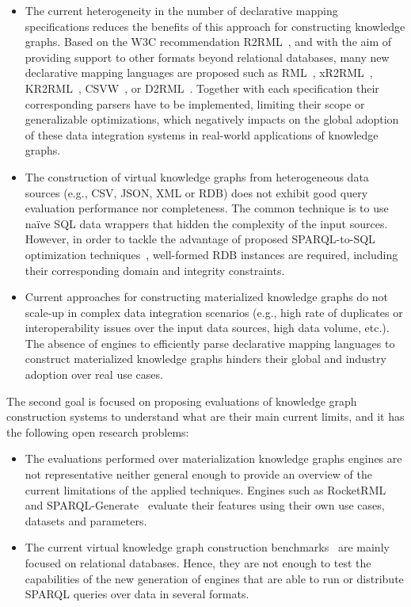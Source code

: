 \begin{itemize}
    \item The current heterogeneity in the number of declarative mapping specifications reduces the benefits of this approach for constructing knowledge graphs. Based on the W3C recommendation R2RML~\citep{R2RML}, and with the aim of providing support to other formats beyond relational databases, many new declarative mapping languages are proposed such as RML~\citep{dimou2014rml}, xR2RML~\citep{michel2015translation}, KR2RML~\citep{slepicka2015kr2rml}, CSVW~\citep{tennison2015model}, or D2RML~\citep{chortaras2018mapping}. Together with each specification their corresponding parsers have to be implemented, limiting their scope or generalizable optimizations, which negatively impacts on the global adoption of these data integration systems in real-world applications of knowledge graphs.

    \item The construction of virtual knowledge graphs from heterogeneous data sources (e.g., CSV, JSON, XML or RDB) does not exhibit good query evaluation performance nor completeness. The common technique is to use na\"ive SQL data wrappers that hidden the complexity of the input sources. However, in order to tackle the advantage of proposed SPARQL-to-SQL optimization techniques~\citep{priyatna2014formalisation,calvanese2017ontop}, well-formed RDB instances are required, including their corresponding domain and integrity constraints.

    \item Current approaches for constructing materialized knowledge graphs do not scale-up in complex data integration scenarios (e.g., high rate of duplicates or interoperability issues over the input data sources, high data volume, etc.). The absence of engines to efficiently parse declarative mapping languages to construct materialized knowledge graphs hinders their global and industry adoption over real use cases.
\end{itemize}

The second goal is focused on proposing evaluations of knowledge graph construction systems to understand what are their main current limits, and it has the following open research problems:
\begin{itemize}
    \item The evaluations performed over materialization knowledge graphs engines are not representative neither general enough to provide an overview of the current limitations of the applied techniques. Engines such as RocketRML~\citep{csimcsek2019rocketrml} and SPARQL-Generate~\citep{lefranccois2017sparql} evaluate their features using their own use cases, datasets and parameters. 
    \item The current virtual knowledge graph construction benchmarks~\citep{lanti2015npd,bizer2009berlin} are mainly focused on relational databases. Hence, they are not enough to test the capabilities of the new generation of engines that are able to run or distribute SPARQL queries over data in several formats. 
\end{itemize}



